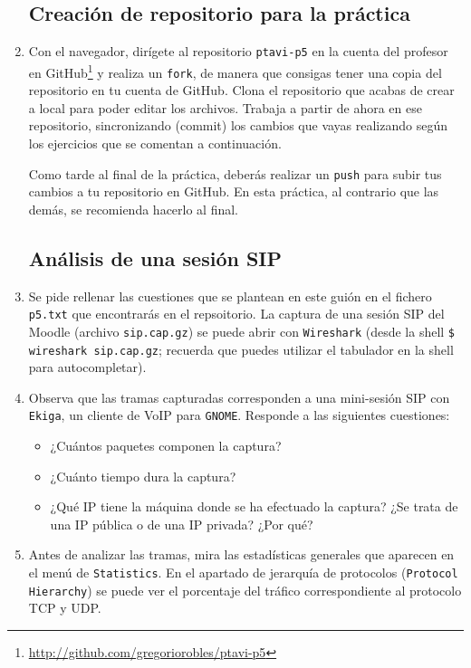 \documentclass[11pt,a4paper]{article}
\begin{document}
\begin{enumerate}

\subsection{Creación de repositorio para la práctica}

  \item Con el navegador, dirígete al repositorio \texttt{ptavi-p5} en la cuenta del profesor en GitHub\footnote{\url{http://github.com/gregoriorobles/ptavi-p5}} y realiza un \texttt{fork}, de manera que consigas tener una copia del repositorio en tu cuenta de GitHub. Clona el repositorio que acabas de crear a local para poder editar los archivos. Trabaja a partir de ahora en ese repositorio, sincronizando (commit) los cambios que vayas realizando según los ejercicios que se comentan a continuación.

  Como tarde al final de la práctica, deberás realizar un \texttt{push} para subir tus cambios a tu repositorio en GitHub. En esta práctica, al contrario que las demás, se recomienda hacerlo al final.

\subsection{Análisis de una sesión SIP}

  \item Se pide rellenar las cuestiones que se plantean en este guión en el fichero \texttt{p5.txt} que encontrarás en el repsoitorio. La captura de una sesión SIP del Moodle (archivo \texttt{sip.cap.gz}) se puede abrir con \texttt{Wireshark} (desde la shell \texttt{\$ wireshark sip.cap.gz}; recuerda que puedes utilizar el tabulador en la shell para autocompletar). 

  \item Observa que las tramas capturadas corresponden a una mini-sesión SIP con \texttt{Ekiga}, un cliente de VoIP para \texttt{GNOME}. Responde a las siguientes cuestiones:
  \begin{itemize}
    \item ¿Cuántos paquetes componen la captura?
    \item ¿Cuánto tiempo dura la captura?
    \item ¿Qué IP tiene la máquina donde se ha efectuado la captura? ¿Se trata de una IP pública o de una IP privada? ¿Por qué?
  \end{itemize}

  \item Antes de analizar las tramas, mira las estadísticas generales que aparecen en el menú de \texttt{Statistics}. En el apartado de jerarquía de protocolos (\texttt{Protocol Hierarchy}) se puede ver el porcentaje del tráfico correspondiente al protocolo TCP y UDP.


\end{enumerate}
\end{document}
